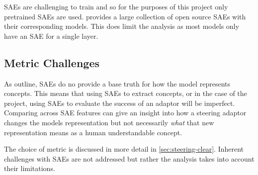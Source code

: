 SAEs are challenging to train and so for the purposes of this project only pretrained SAEs are used.
\citet{saelens} provides a large collection of open source SAEs with their corresponding models.
This does limit the analysis as most models only have an SAE for a single layer.

\subsection{Metric Challenges}

As \citet{saes-bad} outline, SAEs do no provide a base truth for how the model represents concepts.
This means that using SAEs to extract concepts, or in the case of the project, using SAEs to evaluate the success of an adaptor will be imperfect.
Comparing across SAE features can give an insight into how a steering adaptor changes the models representation but not necessarily \emph{what} that new representation means as a human understandable concept.

The choice of metric is discussed in more detail in \cref{sec:steering-clear}.
Inherent challenges with SAEs are not addressed but rather the analysis takes into account their limitations.

